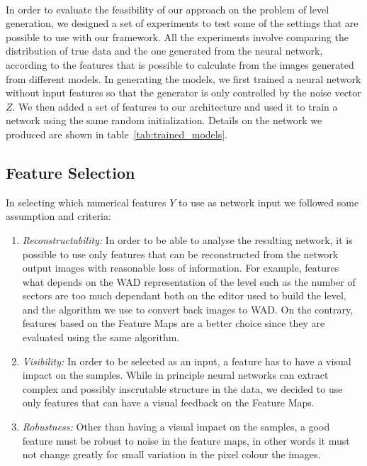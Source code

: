 \paragraph{} In order to evaluate the feasibility of our approach on the problem of level generation, we designed a set of experiments to test some of the settings that are possible to use with our framework. 
All the experiments involve comparing the distribution of true data and the one generated from the neural network, according to the features that is possible to calculate from the images generated from different models. In generating the models, we first trained a neural network without input features so that the generator is only controlled by the noise vector $Z$. We then added a set of features to our architecture and used it to train a network using the same random initialization. Details on the network we produced are shown in table~\ref{tab:trained_models}.


\subsection{Feature Selection}
In selecting which numerical features $Y$ to use as network input we followed some assumption and criteria:
\begin{enumerate}
	\item \textit{Reconstructability:} In order to be able to analyse the resulting network, it is possible to use only features that can be reconstructed from the network output images with reasonable loss of information. For example, features what depends on the WAD representation of the level such as the number of sectors are too much dependant both on the editor used to build the level, and the algorithm we use to convert back images to WAD. On the contrary, features based on the Feature Maps are a better choice since they are evaluated using the same algorithm.
	\item \textit{Visibility:} In order to be selected as an input, a feature has to have a visual impact on the samples. While in principle neural networks can extract complex and possibly inscrutable structure in the data, we decided to use only features that can have a visual feedback on the Feature Maps.
	\item \textit{Robustness:} Other than having a visual impact on the samples, a good feature must be robust to noise in the feature maps, in other words it must not change greatly for small variation in the pixel colour the images. 
\end{enumerate}


